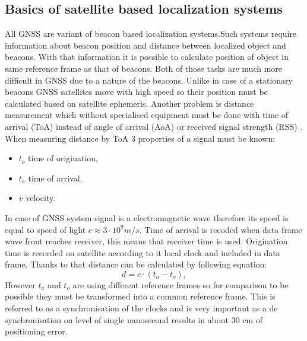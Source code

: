 \documentclass{article}
\begin{document}
\subsection{Basics of satellite based localization systems}
All GNSS are variant of beacon based localization
systems\cite{Blewitt1997}.Such systems require information about beacon position
and distance between localized object and beacons.
With that information it is possible to calculate position of object in same reference
frame as that of beacons.
Both of those tasks are much more difficult in GNSS due to a nature of the beacons.
Unlike in case of a stationary beacons GNSS satellites move with high speed so
their position must be calculated based on satellite ephemeris\cite{Vallado2008}.
Another problem is distance measurement which without specialised equipment must be
done with time of arrival (ToA) instead of angle of arrival (AoA) or
received signal strength (RSS) \cite{Doberstein2012}.
When measuring distance by ToA  3 properties of a signal must be known:
\begin{itemize}
\item $t_o$ time of origination,
\item $t_a$ time of arrival,
\item $v$ velocity.
\end{itemize}
In case of GNSS system signal is a electromagnetic wave therefore its speed is equal
to speed of light $c\approx 3 \cdot 10^{9} m/s$. Time of arrival is recoded when
data frame wave front reaches receiver, this means that receiver time is used.
Origination time is recorded on satellite according to it local clock and
included in data frame. Thanks to that distance can be calculated by following 
equation:
\begin{equation}
  d=c\cdot (t_a-t_o),
\end{equation}
However $t_a$ and $t_o$ are using different reference frames so for comparison
to be possible they must be transformed into a common reference frame.
This is referred to as a synchronisation of the clocks and is very important as
a de synchronisation on level of single nanosecond results in about 30 cm of
positioning error\cite{Enge2011}.

\end{document}
